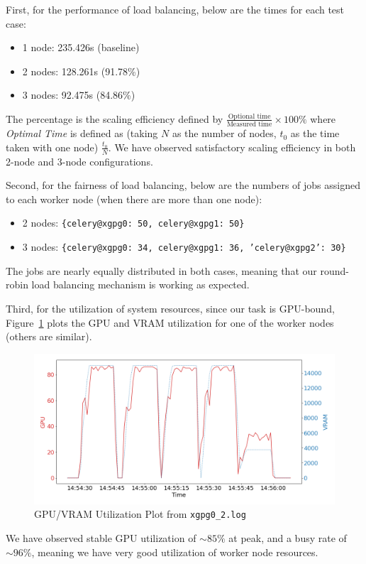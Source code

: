 First, for the performance of load balancing, below are the times for each test case:

\begin{itemize}
    \item 1 node: 235.426s (baseline)
    \item 2 nodes: 128.261s (91.78\%)
    \item 3 nodes: 92.475s (84.86\%)
\end{itemize}
The percentage is the scaling efficiency defined by $\frac{\text{Optional time}}{\text{Measured time}}\times 100\%$ where \emph{Optimal Time} is defined as (taking $N$ as the number of nodes, $t_0$ as the time taken with one node) $\frac{t_0}{N}$. We have observed satisfactory scaling efficiency in both 2-node and 3-node configurations.

Second, for the fairness of load balancing, below are the numbers of jobs assigned to each worker node (when there are more than one node):

\begin{itemize}
    \item 2 nodes: \texttt{\{celery@xgpg0: 50, celery@xgpg1: 50\}}
    \item 3 nodes: \texttt{\{celery@xgpg0: 34, celery@xgpg1: 36, 'celery@xgpg2': 30\}}
\end{itemize}
The jobs are nearly equally distributed in both cases, meaning that our round-robin load balancing mechanism is working as expected.

Third, for the utilization of system resources, since our task is GPU-bound, Figure~\ref{fig:experiment-lb-utilization-plot} plots the GPU and VRAM utilization for one of the worker nodes (others are similar).

\begin{figure}[H]
    \centering
    \includegraphics[width=\textwidth]{images/worker-utilization.png}
    \caption{GPU/VRAM Utilization Plot from \texttt{xgpg0\_2.log}}
    \label{fig:experiment-lb-utilization-plot}
\end{figure}
We have observed stable GPU utilization of $\sim 85\%$ at peak, and a busy rate of $\sim 96\%$, meaning we have very good utilization of worker node resources.

